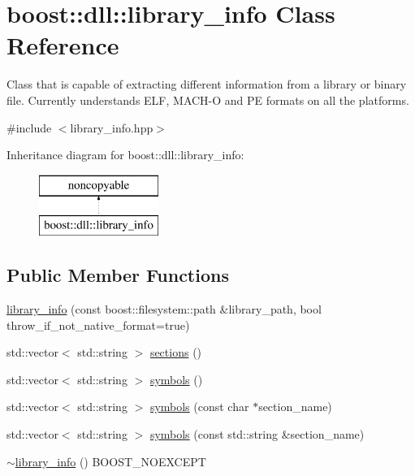 \hypertarget{a01704}{}\section{boost\+:\+:dll\+:\+:library\+\_\+info Class Reference}
\label{a01704}


Class that is capable of extracting different information from a library or binary file. Currently understands E\+LF, M\+A\+C\+H-\/O and PE formats on all the platforms.  




{\ttfamily \#include $<$library\+\_\+info.\+hpp$>$}

Inheritance diagram for boost\+:\+:dll\+:\+:library\+\_\+info\+:\begin{figure}[H]
\begin{center}
\leavevmode
\includegraphics[height=2.000000cm]{a01704}
\end{center}
\end{figure}
\subsection*{Public Member Functions}
\begin{DoxyCompactItemize}
\item 
\hyperlink{a01704_a32c4471296054be76f69deeec9be1c71}{library\+\_\+info} (const boost\+::filesystem\+::path \&library\+\_\+path, bool throw\+\_\+if\+\_\+not\+\_\+native\+\_\+format=true)
\item 
std\+::vector$<$ std\+::string $>$ \hyperlink{a01704_a0463e65b15beaa6843af435464f28019}{sections} ()
\item 
std\+::vector$<$ std\+::string $>$ \hyperlink{a01704_ac033e17288e07d38f3b725a598908a01}{symbols} ()
\item 
std\+::vector$<$ std\+::string $>$ \hyperlink{a01704_a89875161fa1edb4b95aa80380b471436}{symbols} (const char $\ast$section\+\_\+name)
\item 
std\+::vector$<$ std\+::string $>$ \hyperlink{a01704_ac6bac9eeab1e0ac0202172d61302045b}{symbols} (const std\+::string \&section\+\_\+name)
\item 
\hyperlink{a01704_aef1b6b0e24ced9b03ba67569ec636074}{$\sim$library\+\_\+info} () B\+O\+O\+S\+T\+\_\+\+N\+O\+E\+X\+C\+E\+PT
\end{DoxyCompactItemize}


